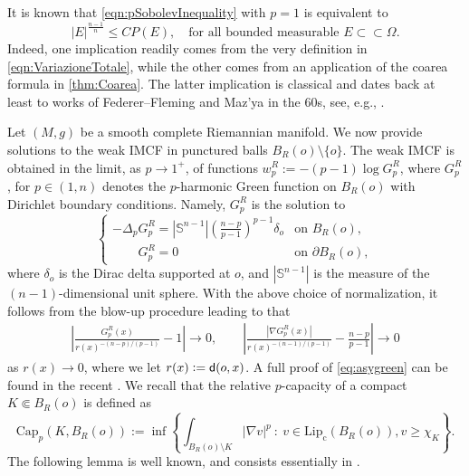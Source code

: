 \documentclass[a4paper,12pt,reqno]{amsart}
\numberwithin{equation}{section}
\theoremstyle{plain}
\theoremstyle{definition}
\theoremstyle{remark}
\newcommand{\abs}[1]{\left\lvert#1\right\rvert}
\newcommand{\st}{\ensuremath{\ :\ }} %
\newcommand{\eqdef}{\ensuremath{\vcentcolon=}}
\newcommand{\dist}{\mathsf{d}}
\begin{document}
{\begin{remark}\label{rem:SobolevToIso}
    It is known that \eqref{eqn:pSobolevInequality} with $p=1$ is equivalent to
    \[
    |E|^{\frac{n-1}{n}}\leq C P(E),\quad \text{for all bounded measurable $E\subset\subset\Omega$}.
    \]
    Indeed, one implication readily comes from the very definition in \eqref{eqn:VariazioneTotale}, while the other comes from an application of the coarea formula in \cref{thm:Coarea}. The latter implication is classical and dates back at least to works of Federer--Fleming and Maz'ya in the 60s, see, e.g., \cite[page 488]{FedererFleming}.
\end{remark}

Let $(M,g)$ be a smooth complete Riemannian manifold. We now provide solutions to the weak IMCF in punctured balls $B_R(o) \setminus \{o\}$. The weak IMCF is obtained in the limit, as $p\to 1^+$, of functions $w_p^R := -(p-1) \log G_p^R$, where $G_p^R$, for $p \in (1, n)$ denotes the $p$-harmonic Green function on $B_R(o)$ with Dirichlet boundary conditions. Namely, $G_p^R$ is the solution to
\begin{equation}
\label{eq:def-green}
\begin{cases}
-\Delta_p G_p^R = \abs{\mathbb{S}^{n-1}}\left(\frac{n-p}{p-1}\right)^{p-1} \delta_o  & \text{on }  B_R(o), \\
\phantom{-\Delta_p} G_p^R = 0  & \text{on }  \partial B_R(o), 
\end{cases}
\end{equation}
where $\delta_o$ is the Dirac delta supported at $o$, and $\abs{\mathbb{S}^{n-1}}$
is the measure of the $(n-1)$-dimensional unit sphere. With the above choice of normalization, it  follows from the blow-up procedure leading to \cite[Theorem 1.1]{kichenassamy-veron} that
\begin{equation}
\label{eq:asygreen}
\begin{split}
\left|\frac{G_p^R(x)}{r(x)^{-{(n-p)}/{(p-1)}}} -1\right| \to 0, 
\qquad
\left|\frac{\abs{\nabla G_p^R(x)}}  {r(x)^{-{(n-1)}/{(p-1)}}} -\frac{n-p}{p-1}\right| \to 0
\end{split}
\end{equation}
as $r(x) \to 0$, where we let $r(x) \eqdef \dist(o, x)$.
A full proof of \eqref{eq:asygreen} can be found in the recent \cite[Theorem 2.1]{bmrsx-preprint}.
We recall that the relative $p$-capacity of a compact $K \Subset B_R(o)$ is defined as
\begin{equation}
    \label{eq:p-cap}
    \mathrm{Cap}_p(K, B_R(o)) := \inf\left\{\int_{B_R(o) \setminus K} \abs{\nabla v}^p \st v\in \mathrm{Lip_c} (B_R(o)), v \geq \chi_K\right\}. 
\end{equation}
The following lemma is well known, and consists essentially in \cite[Lemma 3.8]{holopainen-thesis}. 

}
\end{document}
